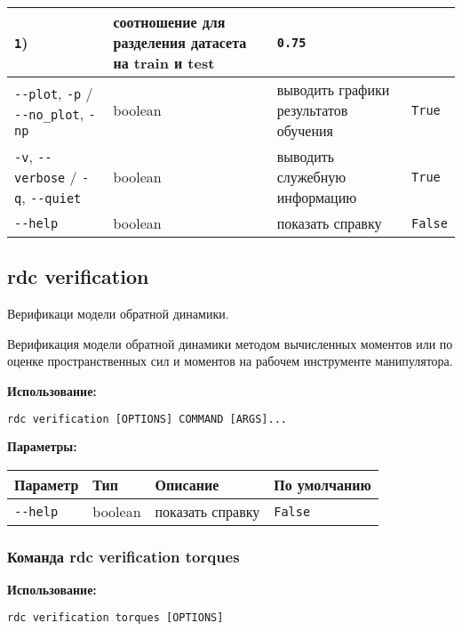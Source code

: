 \begin{center}
\begin{longtable}[]{p{5cm}|p{2cm}|p{3.5cm}|p{5cm}}
\texttt{1}) & соотношение для разделения датасета на train и test & \texttt{0.75} \\
\hline
\texttt{-\/-plot}, \texttt{-p} / \texttt{-\/-no\_plot}, \texttt{-np} &
boolean & выводить графики результатов обучения & \texttt{True} \\
\hline
\texttt{-v}, \texttt{-\/-verbose} / \texttt{-q}, \texttt{-\/-quiet} &
boolean & выводить служебную информацию & \texttt{True} \\
\hline
\texttt{-\/-help} & boolean & показать справку &
\texttt{False} \\
\bottomrule()
\hline
\end{longtable}
\end{center}

\hypertarget{rdc-verification}{%
\subsection{rdc verification}\label{rdc-verification}}

Верификаци модели обратной динамики.

Верификация модели обратной динамики методом вычисленных моментов или по оценке пространственных сил и моментов на рабочем инструменте манипулятора.

\textbf{Использование:}
\begin{lstlisting}[language=python, numbers=none, frame=single]
rdc verification [OPTIONS] COMMAND [ARGS]...
\end{lstlisting}

\textbf{Параметры:}
\begin{center}
\fontsize{10pt}{10pt}\selectfont
\begin{longtable}[]{p{5cm}|p{2cm}|p{3.5cm}|p{5cm}}
    \hline
\toprule()
Параметр & Тип & Описание & По умолчанию \\
\hline
\midrule()
\endhead
\texttt{-\/-help} & boolean & показать справку &
\texttt{False} \\
\bottomrule()
\hline
\end{longtable}
\end{center}

\hypertarget{rdc-verification-torques}{%
\subsubsection{ Команда rdc verification torques}\label{rdc-verification-torques}}

\textbf{Использование:}
\begin{lstlisting}[language=python, numbers=none, frame=single]
rdc verification torques [OPTIONS]
\end{lstlisting}

